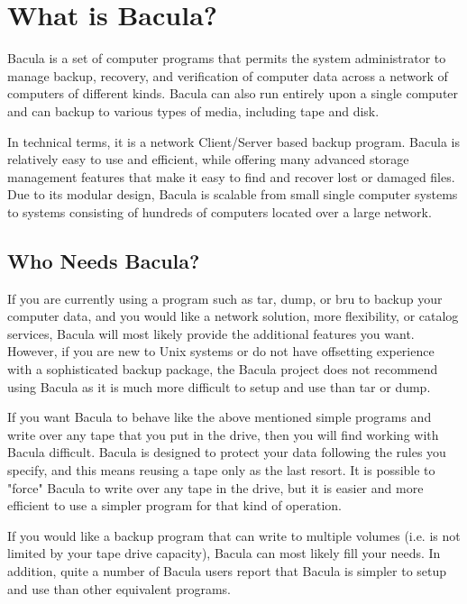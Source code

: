 
\chapter{What is Bacula?}
\label{GeneralChapter}

Bacula is a set of computer programs that permits the system
administrator to manage backup, recovery, and verification of computer data
across a network of computers of different kinds. Bacula can also run entirely
upon a single computer and can backup to various types of media, including tape
and disk.

In technical terms, it is a
network Client/Server based backup program. Bacula is relatively easy to use
and efficient, while offering many advanced storage management features that
make it easy to find and recover lost or damaged files. Due to its modular
design, Bacula is scalable from small single computer systems to systems
consisting of hundreds of computers located over a large network. 

\section{Who Needs Bacula?}

If you are currently using a program such as tar, dump, or
bru to backup your computer data, and you would like a network solution, more
flexibility, or catalog services, Bacula will most likely provide the
additional features you want. However, if you are new to Unix systems or do
not have offsetting experience with a sophisticated backup package, the Bacula project does not
recommend using Bacula as it is much more difficult to setup and use than 
tar or dump. 

If you want Bacula to behave like the above mentioned simple
programs and write over any tape that you put in the drive, then you will find
working with Bacula difficult. Bacula is designed to protect your data
following the rules you specify, and this means reusing a tape only
as the last resort. It is possible to "force" Bacula to write
over any tape in the drive, but it is easier and more efficient to use a
simpler program for that kind of operation.

If you would like a backup program that can write
to multiple volumes (i.e. is not limited by your tape drive capacity), Bacula
can most likely fill your needs. In addition, quite a number of Bacula users
report that Bacula is simpler to setup and use than other equivalent programs.

